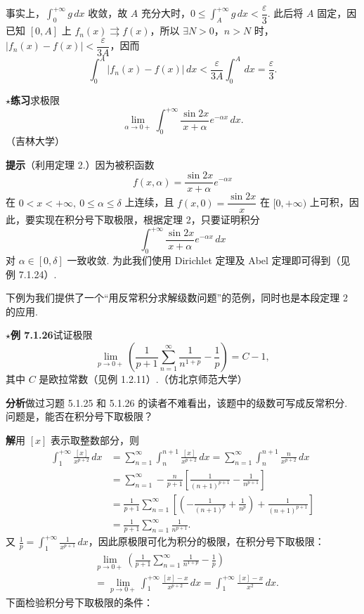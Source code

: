 \documentclass[UTF8,12pt,a4paper,fontset=fandol]{ctexart}
\begin{document}
事实上，$\displaystyle\int_0^{+\infty}g\,dx$ 收敛，故 $A$ 充分大时，$0\le\displaystyle\int_A^{+\infty}g\,dx<\dfrac{\varepsilon}{3}$. 此后将 $A$ 固定，因已知 $[0,A]$ 上 $f_n(x)\rightrightarrows f(x)$，所以 $\exists N>0$，$n>N$ 时，$|f_n(x)-f(x)|<\dfrac{\varepsilon}{3A}$，因而
\[
\int_0^A|f_n(x)-f(x)|\,dx
<\frac{\varepsilon}{3A}\int_0^A\,dx=\frac{\varepsilon}{3}.
\]

\noindent\textbf{$\star$练习}\quad 求极限
\[
\lim_{\alpha\to0+}\int_0^{+\infty}\frac{\sin2x}{x+\alpha}e^{-\alpha x}\,dx.
\]
（吉林大学）

\noindent\textbf{提示}\quad （利用定理 2.）因为被积函数
\[
f(x,\alpha)=\frac{\sin2x}{x+\alpha}e^{-\alpha x}
\]
在 $0<x<+\infty,\ 0\le\alpha\le\delta$ 上连续，且 $f(x,0)=\dfrac{\sin2x}{x}$ 在 $[0,+\infty)$ 上可积，因此，要实现在积分号下取极限，根据定理 2，只要证明积分
\[
\int_0^{+\infty}\frac{\sin2x}{x+\alpha}e^{-\alpha x}\,dx
\]
对 $\alpha\in[0,\delta]$ 一致收敛. 为此我们使用 Dirichlet 定理及 Abel 定理即可得到（见例 7.1.24）.

下例为我们提供了一个“用反常积分求解级数问题”的范例，同时也是本段定理 2 的应用.

\noindent\textbf{$\star$例 7.1.26}\quad 试证极限
\[
\lim_{p\to0+}\left(\frac1{p+1}\sum_{n=1}^{\infty}\frac1{n^{1+p}}-\frac1p\right)=C-1,
\tag{1}
\]
其中 $C$ 是欧拉常数（见例 1.2.11）.（仿北京师范大学）

\noindent\textbf{分析}\quad 做过习题 5.1.25 和 5.1.26 的读者不难看出，该题中的级数可写成反常积分. 问题是，能否在积分号下取极限？

\noindent\textbf{解}\quad 用 $[x]$ 表示取整数部分，则
\[
\begin{aligned}
\int_1^{+\infty}\frac{[x]}{x^{p+2}}\,dx
&=\sum_{n=1}^{\infty}\int_n^{n+1}\frac{[x]}{x^{p+2}}\,dx
=\sum_{n=1}^{\infty}\int_n^{n+1}\frac{n}{x^{p+2}}\,dx\\
&=\sum_{n=1}^{\infty}-\frac{n}{p+1}\left[\frac1{(n+1)^{p+1}}-\frac1{n^{p+1}}\right]\\
&=\frac1{p+1}\sum_{n=1}^{\infty}\left[\left(-\frac1{(n+1)^p}+\frac1{n^p}\right)+\frac1{(n+1)^{p+1}}\right]\\
&=\frac1{p+1}\sum_{n=1}^{\infty}\frac1{n^{p+1}}.
\end{aligned}
\]
又 $\displaystyle\frac1p=\int_1^{+\infty}\frac1{x^{p+1}}\,dx$，因此原极限可化为积分的极限，在积分号下取极限：
\begin{equation}
\begin{aligned}
&\lim_{p\to0+}\left(\frac1{p+1}\sum_{n=1}^{\infty}\frac1{n^{1+p}}-\frac1p\right)\\
&=\lim_{p\to0+}\int_1^{+\infty}\frac{[x]-x}{x^{p+2}}\,dx
=\int_1^{+\infty}\frac{[x]-x}{x^2}\,dx.
\end{aligned}
\tag{2}
\end{equation}
下面检验积分号下取极限的条件：
\end{document}
